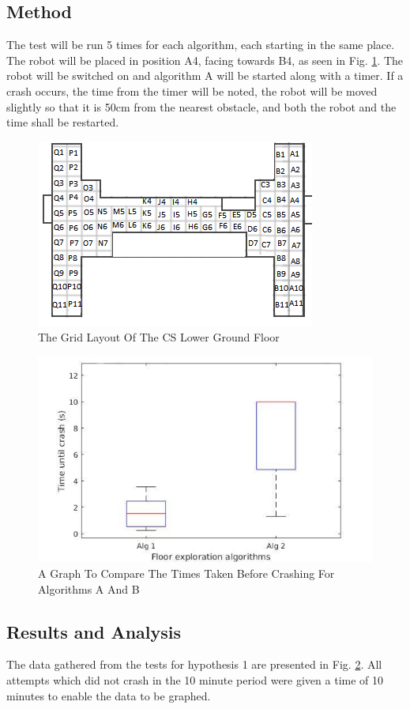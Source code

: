 \documentclass[letterpaper, 10 pt, conference]{ieeeconf}  %
\begin{document}
\subsection{Method}
The test will be run 5 times for each algorithm, each starting in the same place. The robot will be placed in position A4, facing towards B4, as seen in Fig. \ref{fig:map}. 
The robot will be switched on and algorithm A will be started along with a timer.
If a crash occurs, the time from the timer will be noted, the robot will be moved slightly so that it is 50cm from the nearest obstacle, and both the robot and the time shall be restarted.
\begin{figure}[b]
\centering
\captionsetup{justification=centering}
\includegraphics[scale=0.68]{maplgfloor}
\caption{The Grid Layout Of The CS Lower Ground Floor}
\label{fig:map}
\end{figure}
\begin{figure}[tb]
\centering
\captionsetup{justification=centering}
\includegraphics[scale=0.4]{box_plot}
\caption{A Graph To Compare The Times Taken Before Crashing For Algorithms A And B}
\label{fig:boxplot}
\end{figure}
\subsection{Results and Analysis}
The data gathered from the tests for hypothesis 1 are presented in Fig. \ref{fig:boxplot}. All attempts which did not crash in the 10 minute period were given a time of 10 minutes to enable the data to be graphed.
\end{document}
